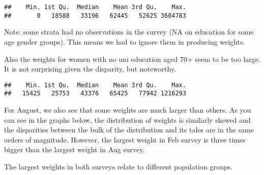 \documentclass[
]{article}
\newenvironment{Shaded}{\begin{snugshade}}{\end{snugshade}}
\newcommand{\AttributeTok}[1]{\textcolor[rgb]{0.13,0.29,0.53}{#1}}
\newcommand{\CommentTok}[1]{\textcolor[rgb]{0.56,0.35,0.01}{\textit{#1}}}
\newcommand{\ConstantTok}[1]{\textcolor[rgb]{0.56,0.35,0.01}{#1}}
\newcommand{\DecValTok}[1]{\textcolor[rgb]{0.00,0.00,0.81}{#1}}
\newcommand{\DocumentationTok}[1]{\textcolor[rgb]{0.56,0.35,0.01}{\textbf{\textit{#1}}}}
\newcommand{\FunctionTok}[1]{\textcolor[rgb]{0.13,0.29,0.53}{\textbf{#1}}}
\newcommand{\NormalTok}[1]{#1}
\newcommand{\OtherTok}[1]{\textcolor[rgb]{0.56,0.35,0.01}{#1}}
\newcommand{\SpecialCharTok}[1]{\textcolor[rgb]{0.81,0.36,0.00}{\textbf{#1}}}
\begin{document}
\begin{verbatim}
##    Min. 1st Qu.  Median    Mean 3rd Qu.    Max. 
##       0   18588   33196   62445   52625 3604783
\end{verbatim}

Note: some strata had no observations in the survey (NA on education for
some age gender groups). This means we had to ignore them in producing
weights.

Also the weights for women with no uni education aged 70+ seem to be too
large. It is not surprising given the disparity, but noteworthy.

\begin{Shaded}
\end{Shaded}

\begin{verbatim}
##    Min. 1st Qu.  Median    Mean 3rd Qu.    Max. 
##   15425   25753   43376   65425   77942 1216293
\end{verbatim}

For August, we also see that some weights are much larger than others.
As you can see in the graphs below, the distribution of weights is
similarly skewed and the disparities between the bulk of the
distribution and its tales are in the same orders of magnitude. However,
the largest weight in Feb survey is three times bigger than the largest
weight in Aug survey.

The largest weights in both surveys relate to different population
groups.
\end{document}

